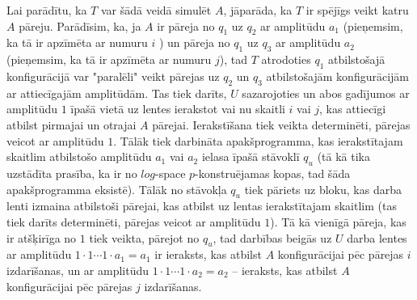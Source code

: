 \documentclass{ludis}
\begin{document}
Lai parādītu, ka $T$ var šādā veidā simulēt $A$, jāparāda, ka $T$ ir spējīgs veikt katru $A$ pāreju. Parādīsim, ka, ja $A$ ir pāreja no $q_1$ uz $q_2$ ar amplitūdu $a_1$ (pieņemsim, ka tā ir apzīmēta ar numuru $i$ ) un pāreja no $q_1$ uz $q_3$ ar amplitūdu $a_2$ (pieņemsim, ka tā ir apzīmēta ar numuru $j$), tad $T$ atrodoties $q_1$ atbilstošajā konfigurācijā var "paralēli" veikt pārejas uz $q_2$ un $q_3$ atbilstošajām konfigurācijām ar attiecīgajām amplitūdām. Tas tiek darīts, $U$ sazarojoties un abos gadījumos ar amplitūdu $1$ īpašā vietā uz lentes ierakstot vai nu skaitli $i$ vai $j$, kas attiecīgi atbilst pirmajai un otrajai $A$ pārejai. Ierakstīšana tiek veikta determinēti, pārejas veicot ar amplitūdu $1$. Tālāk tiek darbināta apakšprogramma, kas ierakstītajam skaitlim atbilstošo amplitūdu $a_1$ vai $a_2$ ielasa īpašā stāvoklī $q_u$ (tā kā tika uzstādīta prasība, ka ir no $log$-space $p$-konstruējamas kopas, tad šāda apakšprogramma eksistē). Tālāk no stāvokļa $q_u$ tiek pāriets uz bloku, kas darba lenti izmaina atbilstoši pārejai, kas atbilst uz lentas ierakstītajam skaitlim (tas tiek darīts determinēti, pārejas veicot ar amplitūdu $1$). Tā kā vienīgā pāreja, kas ir atšķirīga no $1$ tiek veikta, pārejot no $q_u$, tad darbības beigās uz $U$ darba lentes ar amplitūdu $1 \cdot 1 \cdots 1 \cdot a_1 = a_1$ ir ieraksts, kas atbilst $A$ konfigurācijai pēc pārejas $i$ izdarīšanas, un ar amplitūdu $1 \cdot 1 \cdots 1 \cdot a_2 = a_2$ -- ieraksts, kas atbilst $A$ konfigurācijai pēc pārejas $j$ izdarīšanas.
\end{document}
